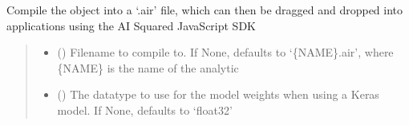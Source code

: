 \documentclass[letterpaper,10pt,english]{sphinxmanual}
\begin{document}
\begin{fulllineitems}
\begin{fulllineitems}
\label{\detokenize{aisquared.config:aisquared.config.GraphConfiguration.GraphConfiguration.auto_run}}
\pysigstartsignatures
{}
\pysigstopsignatures
\end{fulllineitems}


\begin{fulllineitems}
\label{\detokenize{aisquared.config:aisquared.config.GraphConfiguration.GraphConfiguration.compile}}
\pysigstartsignatures
{}
\pysigstopsignatures
\sphinxAtStartPar
Compile the object into a ‘.air’ file, which can then be dragged and dropped into applications using the AI Squared JavaScript SDK
\begin{quote}\begin{description}
\begin{itemize}
\item {} 
\sphinxAtStartPar
{} (\sphinxstyleliteralemphasis{\sphinxupquote{ (}}\sphinxstyleliteralemphasis{\sphinxupquote{)}}) \textendash{} Filename to compile to. If None, defaults to ‘\{NAME\}.air’, where \{NAME\} is the name of the analytic

\item {} 
\sphinxAtStartPar
{} (\sphinxstyleliteralemphasis{\sphinxupquote{ (}}\sphinxstyleliteralemphasis{\sphinxupquote{)}}) \textendash{} The datatype to use for the model weights when using a Keras model. If None, defaults to ‘float32’


\end{itemize}
\end{description}
\end{quote}
\end{fulllineitems}
\end{fulllineitems}
\end{document}

